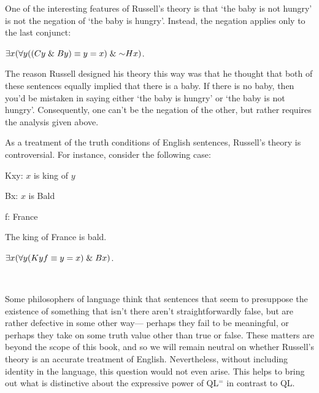 One of the interesting features of Russell's theory is that `the baby is not hungry' is not the negation of `the baby is hungry'.
Instead, the negation applies only to the last conjunct:

\begin{earg}
  \item[\ex{Def4}] $\qt{\exists}{x} (\qt{\forall}{y} ((Cy \eand By) \eiff y = x) \eand \enot Hx)$.
\end{earg}

The reason Russell designed his theory this way was that he thought that both of these sentences equally implied that there is a baby.
If there is no baby, then you'd be mistaken in saying either `the baby is hungry' or `the baby is not hungry'.
Consequently, one can't be the negation of the other, but rather requires the analysis given above.

As a treatment of the truth conditions of English sentences, Russell's theory is controversial.
For instance, consider the following case:

\begin{multicols}{2}

\begin{ekey}
  \item[Kxy:] $x$ is king of $y$
  \item[Bx:] $x$ is Bald
  \item[f:] France
\end{ekey}

\begin{earg}
  \item[\ex{Def4}] The king of France is bald.
  \item[\ex{Def5}] $\exists x (\forall y (Kyf \equiv y = x) \mathrel\& Bx)$.
  \item[] ~
\end{earg}

\end{multicols}

Some philosophers of language think that sentences that seem to presuppose the existence of something that isn't there aren't straightforwardly false, but are rather defective in some other way--- perhaps they fail to be meaningful, or perhaps they take on some truth value other than true or false.
These matters are beyond the scope of this book, and so we will remain neutral on whether Russell's theory is an accurate treatment of English.
Nevertheless, without including identity in the language, this question would not even arise.
This helps to bring out what is distinctive about the expressive power of QL$^=$ in contrast to QL. 







